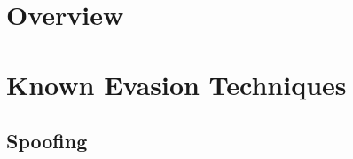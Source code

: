 \documentclass[11pt,fleqn,oneside]{book} %
\begin{document}

\coverpage{\TITLE}{\SUBTITLE}{\AUTHOR}{\DATE}{\SUBJECT}
\newpage
\backgroundbarvisiblefalse



\newpage
\tableofcontents

\part{Overview}


% 


\part{Known Evasion Techniques}
\chapter{Spoofing} \label{ch:known-spoofing}


\newpage
\newpage
\end{document}

